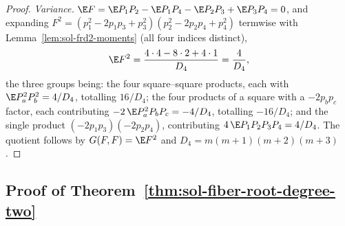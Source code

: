 \documentclass[../main.tex]{subfiles}
\begin{document}
\begin{proof}
\emph{Variance.}  $\E F=\E P_1P_2-\E P_1P_4-\E P_2P_3+\E P_3P_4=0$, and expanding
$F^2=(p_1^2-2p_1p_3+p_3^2)(p_2^2-2p_2p_4+p_4^2)$ termwise with
Lemma~\ref{lem:sol-frd2-moments} (all four indices distinct),
\[
  \E F^2
  =\frac{4\cdot4-8\cdot2+4\cdot1}{D_4}
  =\frac4{D_4},
\]
the three groups being: the four square--square products, each with
$\E P_a^2P_b^2=4/D_4$, totalling $16/D_4$; the four products of a square with a
$-2p_bp_c$ factor, each contributing $-2\,\E P_a^2P_bP_c=-4/D_4$, totalling
$-16/D_4$; and the single product
$(-2p_1p_3)(-2p_2p_4)$, contributing $4\,\E P_1P_2P_3P_4=4/D_4$.  The quotient follows by
$G(F,F)=\E F^2$ and $D_4=m(m+1)(m+2)(m+3)$.
\end{proof}

\subsection*{Proof of Theorem~\ref{thm:sol-fiber-root-degree-two}}
\end{document}
